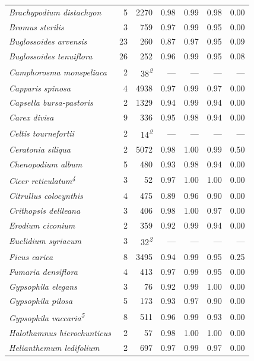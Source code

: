 \documentclass[
  authoryear,
  preprint]{elsarticle}
\begin{document}
\begin{longtable}{@{\extracolsep{\fill}}lrrrrrr}
{\itshape Brachypodium distachyon} & 5 & 2270 & 0.98 & 0.99 & 0.98 & 0.00 \\ 
{\itshape Bromus sterilis} & 3 & 759 & 0.97 & 0.99 & 0.95 & 0.00 \\ 
{\itshape Buglossoides arvensis} & 23 & 260 & 0.87 & 0.97 & 0.95 & 0.09 \\ 
{\itshape Buglossoides tenuiflora} & 26 & 252 & 0.96 & 0.99 & 0.95 & 0.08 \\ 
{\itshape Camphorosma monspeliaca} & 2 & 38\textsuperscript{\textit{2}} & — & — & — & — \\ 
{\itshape Capparis spinosa} & 4 & 4938 & 0.97 & 0.99 & 0.97 & 0.00 \\ 
{\itshape Capsella bursa-pastoris} & 2 & 1329 & 0.94 & 0.99 & 0.94 & 0.00 \\ 
{\itshape Carex divisa} & 9 & 336 & 0.95 & 0.98 & 0.94 & 0.00 \\ 
{\itshape Celtis tournefortii} & 2 & 14\textsuperscript{\textit{2}} & — & — & — & — \\ 
{\itshape Ceratonia siliqua} & 2 & 5072 & 0.98 & 1.00 & 0.99 & 0.50 \\ 
{\itshape Chenopodium album} & 5 & 480 & 0.93 & 0.98 & 0.94 & 0.00 \\ 
{\itshape Cicer reticulatum}\textsuperscript{\textit{4}} & 3 & 52 & 0.97 & 1.00 & 1.00 & 0.00 \\ 
{\itshape Citrullus colocynthis} & 4 & 475 & 0.89 & 0.96 & 0.90 & 0.00 \\ 
{\itshape Crithopsis delileana} & 3 & 406 & 0.98 & 1.00 & 0.97 & 0.00 \\ 
{\itshape Erodium ciconium} & 2 & 359 & 0.92 & 0.99 & 0.94 & 0.00 \\ 
{\itshape Euclidium syriacum} & 3 & 32\textsuperscript{\textit{2}} & — & — & — & — \\ 
{\itshape Ficus carica} & 8 & 3495 & 0.94 & 0.99 & 0.95 & 0.25 \\ 
{\itshape Fumaria densiflora} & 4 & 413 & 0.97 & 0.99 & 0.95 & 0.00 \\ 
{\itshape Gypsophila elegans} & 3 & 76 & 0.92 & 0.99 & 1.00 & 0.00 \\ 
{\itshape Gypsophila pilosa} & 5 & 173 & 0.93 & 0.97 & 0.90 & 0.00 \\ 
{\itshape Gypsophila vaccaria}\textsuperscript{\textit{5}} & 8 & 511 & 0.96 & 0.99 & 0.93 & 0.00 \\ 
{\itshape Halothamnus hierochunticus} & 2 & 57 & 0.98 & 1.00 & 1.00 & 0.00 \\ 
{\itshape Helianthemum ledifolium} & 2 & 697 & 0.97 & 0.99 & 0.97 & 0.00 \\ 

\end{longtable}
\end{document}
